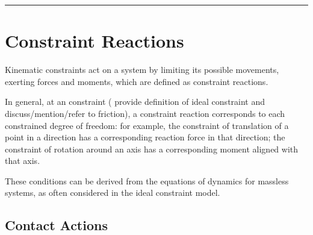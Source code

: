 \documentclass[letterpaper,10pt,english]{jupyterBook}
\begin{document}
\bigskip\hrule\bigskip


\sphinxstepscope


\section{Constraint Reactions}
\label{\detokenize{ch/actions-reactions:constraint-reactions}}\label{\detokenize{ch/actions-reactions:classical-mechanics-actions-reactions}}\label{\detokenize{ch/actions-reactions::doc}}
\sphinxAtStartPar
Kinematic constraints act on a system by limiting its possible movements, exerting forces and moments, which are defined as constraint reactions.

\sphinxAtStartPar
In general, at an  constraint ( provide definition of ideal constraint and discuss/mention/refer to friction), a constraint reaction corresponds to each constrained degree of freedom: for example, the constraint of translation of a point in a direction has a corresponding reaction force in that direction; the constraint of rotation around an axis has a corresponding moment aligned with that axis.

\sphinxAtStartPar
These conditions can be derived from the equations of dynamics for massless systems, as often considered in the ideal constraint model.


\subsection{Contact Actions}
\label{\detokenize{ch/actions-reactions:contact-actions}}\label{\detokenize{ch/actions-reactions:classical-mechanics-actions-reactions-contact}}
\end{document}
